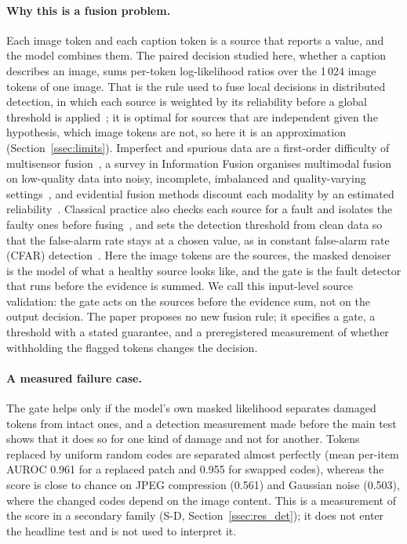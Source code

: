 \paragraph{Why this is a fusion problem.}
Each image token and each caption token is a source that reports a value, and the model combines them.
The paired decision studied here, whether a caption describes an image, sums per-token log-likelihood ratios over the 1\,024
image tokens of one image.
That is the rule used to fuse local decisions in distributed detection, in which each source is weighted by its reliability
before a global threshold is applied~\citep{chair1986optimal,tenney1981detection}; it is optimal for sources that are independent
given the hypothesis, which image tokens are not, so here it is an approximation (Section~\ref{ssec:limits}).
Imperfect and spurious data are a first-order difficulty of multisensor fusion~\citep{khaleghi2013multisensor,vempaty2013byzantine},
a survey in Information Fusion organises multimodal fusion on low-quality data into noisy, incomplete, imbalanced and quality-varying
settings~\citep{zhang2026lowquality}, and evidential fusion methods discount each modality by an estimated
reliability~\citep{shao2024ddef,huang2025evidential}.
Classical practice also checks each source for a fault and isolates the faulty ones before fusing~\citep{willsky1976survey,gao2015survey},
and sets the detection threshold from clean data so that the false-alarm rate stays at a chosen value, as in constant false-alarm
rate (CFAR) detection~\citep{finn1968adaptive,rohling1983cfar}.
Here the image tokens are the sources, the masked denoiser is the model of what a healthy source looks like, and the gate is the
fault detector that runs before the evidence is summed.
We call this input-level source validation: the gate acts on the sources before the evidence sum, not on the output decision.
The paper proposes no new fusion rule; it specifies a gate, a threshold with a stated guarantee, and a preregistered measurement
of whether withholding the flagged tokens changes the decision.

\paragraph{A measured failure case.}
The gate helps only if the model's own masked likelihood separates damaged tokens from intact ones, and a detection measurement
made before the main test shows that it does so for one kind of damage and not for another.
Tokens replaced by uniform random codes are separated almost perfectly (mean per-item AUROC 0.961 for a replaced patch and 0.955
for swapped codes), whereas the score is close to chance on JPEG compression (0.561) and Gaussian noise (0.503), where the changed
codes depend on the image content.
This is a measurement of the score in a secondary family (S-D, Section~\ref{ssec:res_det}); it does not enter the headline test and
is not used to interpret it.

